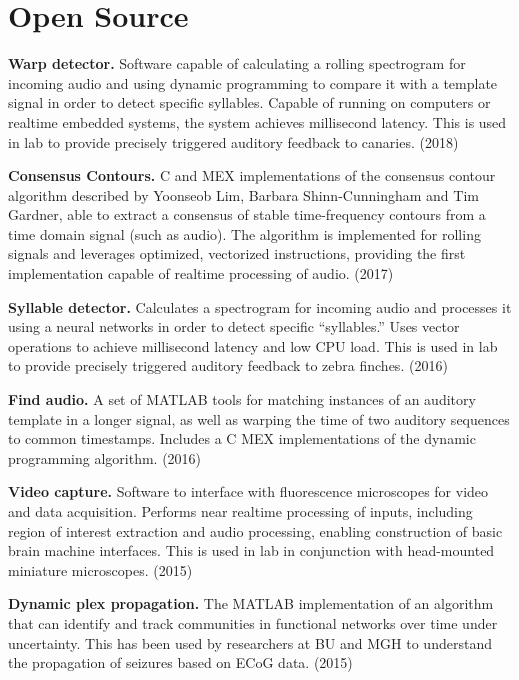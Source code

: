 \section*{Open Source}
	\textbf{Warp detector.} Software capable of calculating a rolling spectrogram for incoming audio and using dynamic programming to compare it with a template signal in order to detect specific syllables. Capable of running on computers or realtime embedded systems, the system achieves millisecond latency. This is used in lab to provide precisely triggered auditory feedback to canaries. (2018)

\bigskip

\noindent
	\textbf{Consensus Contours.} C and MEX implementations of the consensus contour algorithm described by Yoonseob Lim, Barbara Shinn-Cunningham and Tim Gardner, able to extract a consensus of stable time-frequency contours from a time domain signal (such as audio). The algorithm is implemented for rolling signals and leverages optimized, vectorized instructions, providing the first implementation capable of realtime processing of audio. (2017)

\bigskip

\noindent
	\textbf{Syllable detector.} Calculates a spectrogram for incoming audio and processes it using a neural networks in order to detect specific ``syllables.'' Uses vector operations to achieve millisecond latency and low CPU load. This is used in lab to provide precisely triggered auditory feedback to zebra finches. (2016)

\bigskip

\noindent
	\textbf{Find audio.} A set of MATLAB tools for matching instances of an auditory template in a longer signal, as well as warping the time of two auditory sequences to common timestamps. Includes a C MEX implementations of the dynamic programming algorithm. (2016)

\bigskip

\noindent
	\textbf{Video capture.} Software to interface with fluorescence microscopes for video and data acquisition. Performs near realtime processing of inputs, including region of interest extraction and audio processing, enabling construction of basic brain machine interfaces. This is used in lab in conjunction with head-mounted miniature microscopes. (2015)

\bigskip

\noindent
	\textbf{Dynamic plex propagation.} The MATLAB implementation of an algorithm that can identify and track communities in functional networks over time under uncertainty. This has been used by researchers at BU and MGH to understand the propagation of seizures based on ECoG data. (2015)

